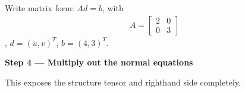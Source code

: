 \documentclass[letterpaper,11pt,english,openany,oneside]{jupyterBook}
\begin{document}
\sphinxAtStartPar
Write matrix form: {\color{QuizMathBlue} \(Ad=b\)}, with
{\color{QuizMathBlue} \begin{equation*}
\begin{split}
A=\begin{bmatrix}2&0\\0&3\end{bmatrix}
\end{split}
\end{equation*}}
\sphinxAtStartPar
, {\color{QuizMathBlue} \(d=(u,v)^T\)}, {\color{QuizMathBlue} \(b=(4,3)^T\)}.

\par

\par\medskip{}
{\color{QuizStepRed}\bfseries Step 4 — Multiply out the normal equations}\par\smallskip

\sphinxAtStartPar
{} This exposes the structure tensor and right\sphinxhyphen{}hand side completely.
\end{document}

